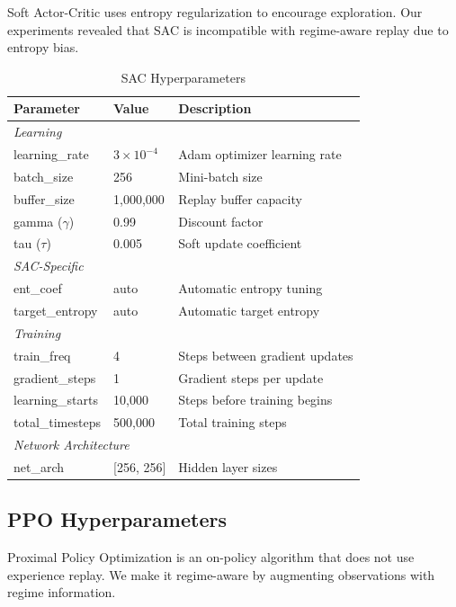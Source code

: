 \documentclass[11pt,a4paper]{article}
\begin{document}
Soft Actor-Critic uses entropy regularization to encourage exploration. Our experiments revealed that SAC is incompatible with regime-aware replay due to entropy bias.

\begin{table}[H]
\centering
\caption{SAC Hyperparameters}
\label{tab:sac-params}
\begin{tabular}{lll}
\toprule
\textbf{Parameter} & \textbf{Value} & \textbf{Description} \\
\midrule
\multicolumn{3}{l}{\textit{Learning}} \\
learning\_rate & $3 \times 10^{-4}$ & Adam optimizer learning rate \\
batch\_size & 256 & Mini-batch size \\
buffer\_size & 1,000,000 & Replay buffer capacity \\
gamma ($\gamma$) & 0.99 & Discount factor \\
tau ($\tau$) & 0.005 & Soft update coefficient \\
\midrule
\multicolumn{3}{l}{\textit{SAC-Specific}} \\
ent\_coef & auto & Automatic entropy tuning \\
target\_entropy & auto & Automatic target entropy \\
\midrule
\multicolumn{3}{l}{\textit{Training}} \\
train\_freq & 4 & Steps between gradient updates \\
gradient\_steps & 1 & Gradient steps per update \\
learning\_starts & 10,000 & Steps before training begins \\
total\_timesteps & 500,000 & Total training steps \\
\midrule
\multicolumn{3}{l}{\textit{Network Architecture}} \\
net\_arch & [256, 256] & Hidden layer sizes \\
\bottomrule
\end{tabular}
\end{table}

\subsection{PPO Hyperparameters}

Proximal Policy Optimization is an on-policy algorithm that does not use experience replay. We make it regime-aware by augmenting observations with regime information.
\end{document}
